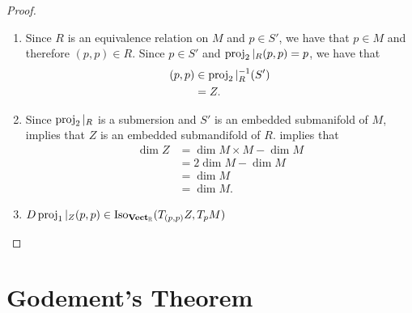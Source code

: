 \documentclass{book}
\begin{document}
	\begin{proof}\
		\begin{enumerate}
			\item Since $R$ is an equivalence relation on $M$ and $p \in S'$, we have that $p \in M$ and therefore $(p,p) \in R$. Since $p \in S'$ and $\operatorname{\text{proj}}_2|_R(p,p) = p$, we have that
			\begin{align*}
				(p,p) 
				& \in \operatorname{\text{proj}}_2|_R^{-1}(S') \\
				& = Z.
			\end{align*}
			\item Since $\operatorname{\text{proj}}_2|_R$ is a submersion and $S'$ is an embedded submanifold of $M$,  implies that $Z$ is an embedded submandifold of $R$. \rex{}  implies that
			\begin{align*}
				\dim Z 
				& = \dim M \times M - \dim M \\
				& = 2 \dim M - \dim M \\
				& = \dim M \\
				& = \dim M.
			\end{align*}
			\item $D\operatorname{\text{proj}}_1|_Z(p,p) \in \operatorname{Iso}_{\operatorname*{\text{\textbf{Vect}}_{\mathbb{R}}}}(T_{(p,p)}Z, T_pM)$  
		\end{enumerate}
	\end{proof}






































	
	
	
	
	
	
	
	
	
	
	\newpage
	\section{Godement's Theorem}
\end{document}

